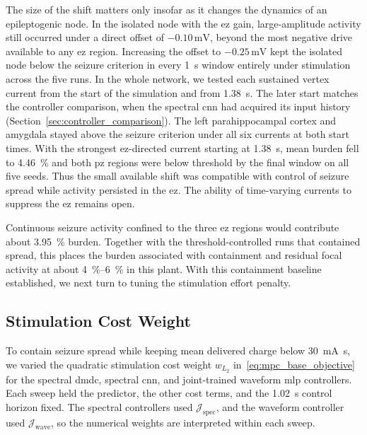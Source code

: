 The size of the shift matters only insofar as it changes the dynamics of an epileptogenic node.
In the isolated node with the \ac{ez} gain, large-amplitude activity still occurred under a direct offset of $-0.10\,\si{\milli\volt}$, beyond the most negative drive available to any \ac{ez} region.
Increasing the offset to $-0.25\,\si{\milli\volt}$ kept the isolated node below the seizure criterion in every \SI{1}{\second} window entirely under stimulation across the five runs.
In the whole network, we tested each sustained vertex current from the start of the simulation and from \SI{1.38}{\second}.
The later start matches the controller comparison, when the spectral \ac{cnn} had acquired its input history (Section~\ref{sec:controller_comparison}).
The left parahippocampal cortex and amygdala stayed above the seizure criterion under all six currents at both start times.
With the strongest \ac{ez}-directed current starting at \SI{1.38}{\second}, mean burden fell to \SI{4.46}{\percent} and both \ac{pz} regions were below threshold by the final window on all five seeds.
Thus the small available shift was compatible with control of seizure spread while activity persisted in the \ac{ez}.
The ability of time-varying currents to suppress the \ac{ez} remains open.

Continuous seizure activity confined to the three \ac{ez} regions would contribute about \SI{3.95}{\percent} burden.
Together with the threshold-controlled runs that contained spread, this places the burden associated with containment and residual focal activity at about \SIrange{4}{6}{\percent} in this plant.
With this containment baseline established, we next turn to tuning the stimulation effort penalty.

\subsection{Stimulation Cost Weight}\label{sec:stimulation_cost_weight}

To contain seizure spread while keeping mean delivered charge below \SI{30}{\milli\ampere\second}, we varied the quadratic stimulation cost weight $w_{L_2}$ in~\eqref{eq:mpc_base_objective} for the spectral \ac{dmdc}, spectral \ac{cnn}, and joint-trained waveform \ac{mlp} controllers.
Each sweep held the predictor, the other cost terms, and the \SI{1.02}{\second} control horizon fixed.
The spectral controllers used $\mathcal J_{\mathrm{spec}}$, and the waveform controller used $\mathcal J_{\mathrm{wave}}$, so the numerical weights are interpreted within each sweep.

